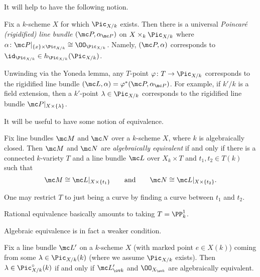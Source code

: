 \documentclass[../notes.tex]{subfiles}
\begin{document}
It will help to have the following notion.
\begin{definition}
	Fix a $k$-scheme $X$ for which $\Pic_{X/k}$ exists. Then there is a universal \textit{Poincar\'e (rigidified) line bundle} $(\mc P,\alpha_{\mc P})$ on $X\times_k\Pic_{X/k}$ where $\alpha\colon\mc P|_{\{x\}\times\Pic_{X/k}}\cong\OO_{\Pic_{X/k}}$. Namely, $(\mc P,\alpha)$ corresponds to ${\id_{\Pic_{X/k}}}\in h_{\Pic_{X/k}}({\Pic_{X/k}})$.
\end{definition}
\begin{remark}
	Unwinding via the Yoneda lemma, any $T$-point $\varphi\colon T\to\Pic_{X/k}$ corresponds to the rigidified line bundle $(\mc L,\alpha)=\varphi^*(\mc P,\alpha_{\mc P})$. For example, if $k'/k$ is a field extension, then a $k'$-point $\lambda\in\Pic_{X/k}$ corresponds to the rigidified line bundle $\mc P|_{X\times\{\lambda\}}$.
\end{remark}
It will be useful to have some notion of equivalence.
\begin{definition}
	Fix line bundles $\mc M$ and $\mc N$ over a $k$-scheme $X$, where $k$ is algebraically closed. Then $\mc M$ and $\mc N$ are \textit{algebraically equivalent} if and only if there is a connected $k$-variety $T$ and a line bundle $\mc L$ over $X_{k}\times T$ and $t_1,t_2\in T(k)$ such that
	\[\mc M\cong\mc L|_{X\times\{t_1\}}\qquad\text{and}\qquad\mc N\cong\mc L|_{X\times\{t_2\}}.\]
\end{definition}
\begin{remark}
	One may restrict $T$ to just being a curve by finding a curve between $t_1$ and $t_2$.
\end{remark}
\begin{remark}
	Rational equivalence basically amounts to taking $T=\PP^1_k$.
\end{remark}
Algebraic equivalence is in fact a weaker condition.
\begin{lemma} \label{lem:use-alg-equiv}
	Fix a line bundle $\mc L'$ on a $k$-scheme $X$ (with marked point $e\in X(k)$) coming from some $\lambda\in\Pic_{X/k}(k)$ (where we assume $\Pic_{X/k}$ exists). Then $\lambda\in\Pic^\circ_{X/k}(k)$ if and only if $\mc L'_{\ov k}$ and $\OO_{X_{\ov k}}$ are algebraically equivalent.
\end{lemma}
\end{document}
